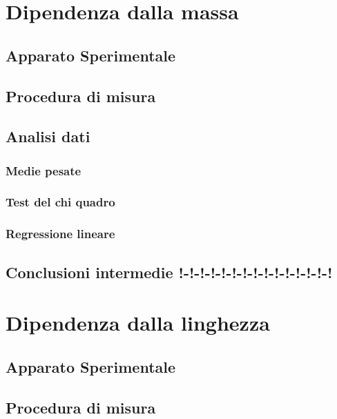 \documentclass[11pt, twoside, a4paper]{article}
\begin{document}

\newpage

\newpage


\section{Dipendenza dalla massa}
%
\subsection{Apparato Sperimentale}
	
\subsection{Procedura di misura}
	
\subsection{Analisi dati}
%
\subsubsection{Medie pesate}
		
\subsubsection{Test del chi quadro}
		
\subsubsection{Regressione lineare}
		
\subsection{Conclusioni intermedie !-!-!-!-!-!-!-!-!-!-!-!-!-!-!}
	
\newpage
\section{Dipendenza dalla linghezza}
	\subsection{Apparato Sperimentale}
	
	\subsection{Procedura di misura}
	
\end{document}
